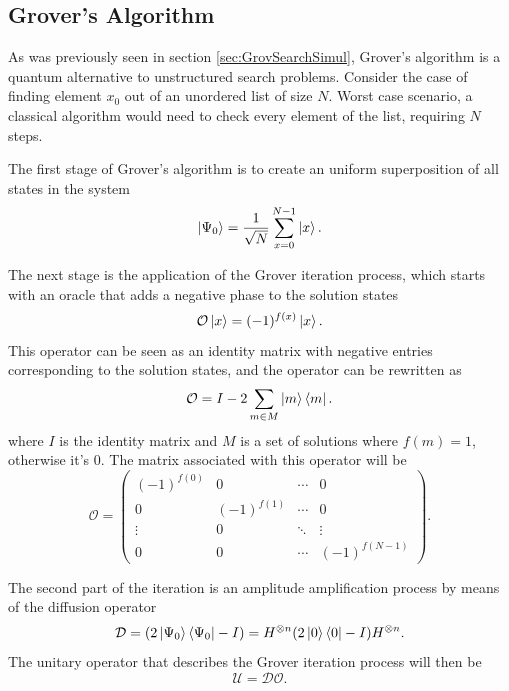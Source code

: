 \documentclass[../../dissertation.tex]{subfiles}
\begin{document}
\subsection{Grover's Algorithm}
As was previously seen in section \ref{sec:GrovSearchSimul}, Grover's algorithm
is a quantum alternative to unstructured search problems. Consider the case of
finding element $x_0$ out of an unordered list of size $N$. Worst case
scenario, a classical algorithm would need to check every element of the list,
requiring $N$ steps.\par

The first stage of Grover's algorithm is to create an uniform superposition of
all states in the system
\begin{equation}
	\ket{\Psi_0}  = \frac{1}{\sqrt{N}}\sum_{x=0}^{N-1} \ket{x}.
\end{equation}\par
The next stage is the application of the Grover iteration process, which starts
with an oracle that adds a negative phase to the solution states
\begin{equation}
        \mathcal{O}\ket{x} = (-1)^{f(x)}\ket{x}.
\end{equation}
This operator can be seen as an identity matrix with negative entries
corresponding to the solution states, and the operator can be rewritten as 
\begin{equation}
	\mathcal{O} = I - 2\sum_{m\in M} \ket{m}\bra{m}.
	\label{eq:groverQiskitOracle}
\end{equation}
where $I$ is the identity matrix and $M$ is a set of solutions where $f(m) =
1$, otherwise it's $0$. The matrix associated with this operator will be
\begin{equation}
	\mathcal{O} = 
	\begin{pmatrix}
		(-1)^{f(0)} & 0 & \cdots & 0\\
	        0 & (-1)^{f(1)} & \cdots & 0\\ 
	        \vdots & 0 &  \ddots & \vdots\\ 
		0 & 0 & \cdots &  (-1)^{f(N-1)}
	\end{pmatrix}.
	\label{eq:oracleMatrixQiskit}
\end{equation}\par
The second part of the iteration is an amplitude amplification process by means
of the diffusion operator 
\begin{equation}
        \mathcal{D} = (2\ket{\Psi_0}\bra{\Psi_0} - I) = H^{\otimes n}(2\ket{0}\bra{0} - I)H^{\otimes n}.
	\label{eq:groverQiskitDiffusion}
\end{equation}
The unitary operator that describes the Grover iteration process will then be
\begin{equation}
        \mathcal{U} = \mathcal{D}\mathcal{O}.
\end{equation}\par
\end{document}
